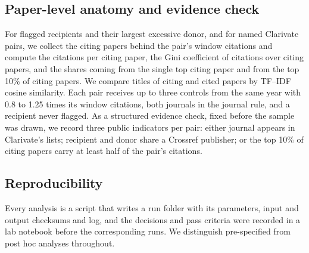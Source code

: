 \subsection{Paper-level anatomy and evidence check}
For flagged recipients and their largest excessive donor, and for named Clarivate pairs, we collect the citing papers
behind the pair's window citations and compute the citations per citing paper, the Gini coefficient of citations
over citing papers, and the shares coming from the single top citing paper and from the top 10\% of citing papers. We
compare titles of citing and cited papers by TF--IDF cosine similarity. Each pair receives up to three controls from
the same year with 0.8 to 1.25 times its window citations, both journals in the journal rule, and a recipient never
flagged. As a structured evidence check, fixed before the sample was drawn, we record three public indicators per
pair: either journal appears in Clarivate's lists; recipient and donor share a Crossref publisher; or the top 10\% of
citing papers carry at least half of the pair's citations.

\subsection{Reproducibility}
Every analysis is a script that writes a run folder with its parameters, input and output checksums and log, and the
decisions and pass criteria were recorded in a lab notebook before the corresponding runs. We distinguish
pre-specified from post hoc analyses throughout.

